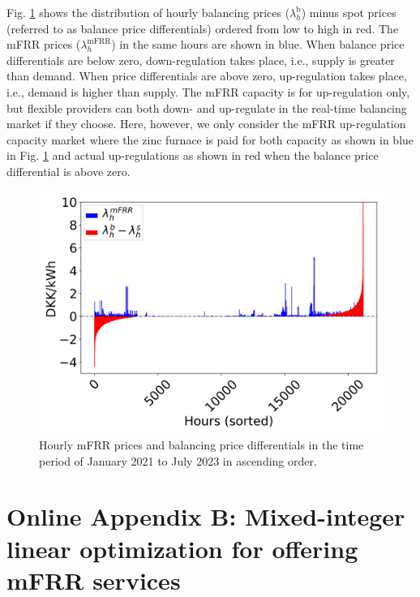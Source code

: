 \documentclass[conference]{IEEEtran}
\begin{document}

Fig. \ref{fig:mfrr_prices_2022} shows the distribution of hourly balancing prices ($\lambda_{h}^{\text{b}}$) minus spot prices (referred to as balance price differentials) ordered from low to high in red. The mFRR prices ($\lambda_{h}^{\text{mFRR}}$) in the same hours are shown in blue. When balance price differentials are below zero, down-regulation takes place, i.e., supply is greater than demand. When price differentials are above zero, up-regulation takes place, i.e., demand is higher than supply. The mFRR capacity is for up-regulation only, but flexible providers can both down- and up-regulate in the real-time balancing market if they choose. Here, however, we only consider the mFRR up-regulation capacity market where the zinc furnace is paid for both capacity as shown in blue in Fig. \ref{fig:mfrr_prices_2022} and actual up-regulations as shown in red when the balance price differential is above zero.

\begin{figure}[t]
    \centering
    \includegraphics[width=\columnwidth]{../figures/mfrr_prices.png}
    \caption{\small{Hourly mFRR prices and balancing price differentials in the time period of January 2021 to July 2023 in ascending order.}}
    \label{fig:mfrr_prices_2022}
\end{figure}


\section*{Online Appendix B: Mixed-integer linear optimization for offering mFRR services}\label{appendix:D}
\end{document}
